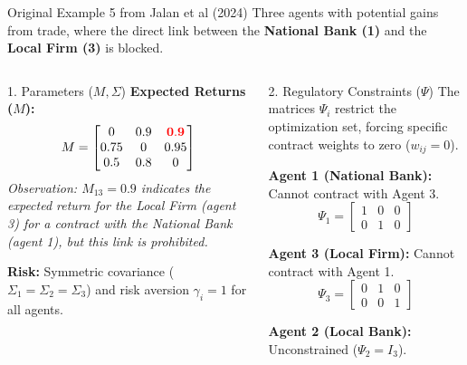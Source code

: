 \documentclass[aspectratio=169]{beamer}
\begin{document}
\begin{frame}{Original Example 5 from Jalan et al (2024)}
    \small
    Three agents with potential gains from trade, where the direct link between the \textbf{National Bank (1)} and the \textbf{Local Firm (3)} is blocked.
    
    \begin{columns}[T]
            \begin{block}{1. Parameters ($M, \Sigma$)}
                \textbf{Expected Returns ($M$):}
                $$
                M = \begin{bmatrix} 
                    0 & 0.9 & \textcolor{red}{\mathbf{0.9}} \\ 
                    0.75 & 0 & 0.95 \\ 
                    0.5 & 0.8 & 0 
                \end{bmatrix}
                $$
                \footnotesize{\textit{Observation: $M_{13}=0.9$ indicates the expected return for the Local Firm (agent 3) for a contract with the National Bank (agent 1), but this link is prohibited.}}
                
                \vspace{0.2cm}
                \textbf{Risk:} Symmetric covariance ($\Sigma_1=\Sigma_2=\Sigma_3$) and risk aversion $\gamma_i=1$ for all agents.
            \end{block}

            \begin{block}{2. Regulatory Constraints ($\Psi$)}
                The matrices $\Psi_i$ restrict the optimization set, forcing specific contract weights to zero ($w_{ij}=0$).
                
                \vspace{0.2cm}
                \textbf{Agent 1 (National Bank):} 
                Cannot contract with Agent 3.
                $$ \Psi_1 = \begin{bmatrix} 1 & 0 & 0 \\ 0 & 1 & 0 \end{bmatrix} $$
                
                \textbf{Agent 3 (Local Firm):} 
                Cannot contract with Agent 1.
                $$ \Psi_3 = \begin{bmatrix} 0 & 1 & 0 \\ 0 & 0 & 1 \end{bmatrix} $$
                
                \textbf{Agent 2 (Local Bank):} 
                Unconstrained ($\Psi_2 = I_3$).
            \end{block}
    \end{columns}
\end{frame}
\end{document}
